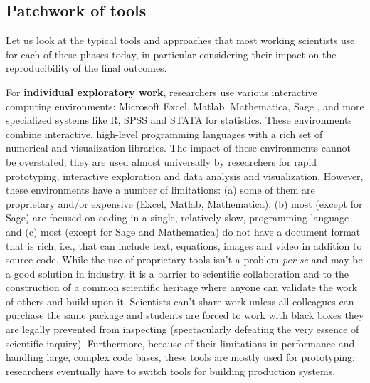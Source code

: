 \documentclass[ChapterTOCs,krantz2]{krantz} %
\begin{document}
\subsection{Patchwork of tools}

Let us look at the typical tools and approaches that most working scientists
use for each of these phases today, in particular considering their impact on
the reproducibility of the final outcomes. 

For \textbf{individual exploratory work}, researchers use various interactive
computing environments: Microsoft Excel, Matlab, Mathematica, Sage \cite{sage},
and more specialized systems like R, SPSS and STATA for statistics. These
environments combine interactive, high-level programming languages with a rich
set of numerical and visualization libraries. The impact of these environments
cannot be overstated; they are used almost universally by researchers for rapid
prototyping, interactive exploration and data analysis and
visualization. However, these environments have a number of limitations: (a)
some of them are proprietary and/or expensive (Excel, Matlab, Mathematica), (b)
most (except for Sage) are focused on coding in a single, relatively slow,
programming language and (c) most (except for Sage and Mathematica) do not have
a document format that is rich, i.e., that can include text, equations, images
and video in addition to source code. While the use of proprietary tools isn't
a problem \emph{per se} and may be a good solution in industry, it is a barrier
to scientific collaboration and to the construction of a common scientific
heritage where anyone can validate the work of others and build upon it.
Scientists can't share work unless all colleagues can purchase the same package
and students are forced to work with black boxes they are legally prevented
from inspecting (spectacularly defeating the very essence of scientific
inquiry). Furthermore, because of their limitations in performance and handling
large, complex code bases, these tools are mostly used for prototyping:
researchers eventually have to switch tools for building production systems.
\end{document}
